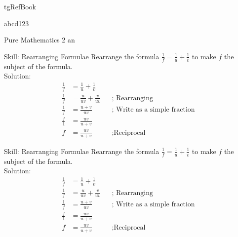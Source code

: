 \begin{taggedblock}{tgRefBook}
\end{taggedblock}


abcd123\\

\begin{envRefBook}
    Pure Mathematics 2 an
\end{envRefBook}


\begin{bxTip}[colbacktitle=bkcolor]{Skill: Rearranging Formulae}
    Rearrange the formula $\frac{1}{f}=\frac{1}{u}+\frac{1}{v} $ to make $f$ the subject of the formula. \\
    
	\tcbline
    Solution:    
    \begin{align*}
        \frac{1}{f}&=\frac{1}{u}+\frac{1}{v}         && \text{ }                              \\[10pt]
        \frac{1}{f}&=\frac{u}{uv}+\frac{v}{uv}       && \text{; Rearranging}                   \\[10pt]
        \frac{1}{f}&=\frac{u+v}{uv}                  && \text{; Write as a simple fraction}    \\[10pt]
        \frac{f}{1}&=\frac{uv}{u+v}                  && \text{ }                            \\[10pt]
        f&=\frac{uv}{u+v}                            && \text{;Reciprocal}  
\end{align*}        
\end{bxTip}



\begin{bxTip}[colbacktitle=green]{Skill: Rearranging Formulae}
    Rearrange the formula $\frac{1}{f}=\frac{1}{u}+\frac{1}{v} $ to make $f$ the subject of the formula. \\
    
    Solution:    
    \begin{align*}
        \frac{1}{f}&=\frac{1}{u}+\frac{1}{v}         && \text{ }                              \\[10pt]
        \frac{1}{f}&=\frac{u}{uv}+\frac{v}{uv}       && \text{; Rearranging}                   \\[10pt]
        \frac{1}{f}&=\frac{u+v}{uv}                  && \text{; Write as a simple fraction}    \\[10pt]
        \frac{f}{1}&=\frac{uv}{u+v}                  && \text{ }                            \\[10pt]
        f&=\frac{uv}{u+v}                            && \text{;Reciprocal}  
\end{align*}        
\end{bxTip}


